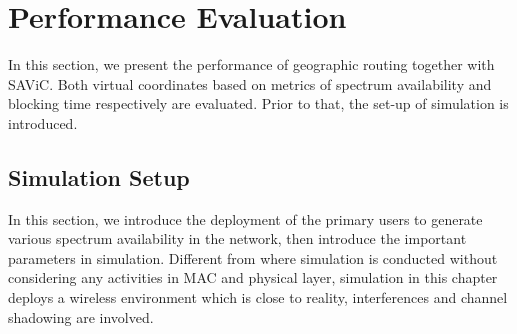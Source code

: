 \section{Performance Evaluation}
In this section, we present the performance of geographic routing together with SAViC.
Both virtual coordinates based on metrics of spectrum availability and blocking time respectively are evaluated.
Prior to that, the set-up of simulation is introduced.


\subsection{Simulation Setup}
In this section, we introduce the deployment of the primary users to generate various spectrum availability in the network, then introduce the important parameters in simulation.
Different from \cite{gpsfree05infocom} where simulation is conducted without considering any activities in MAC and physical layer, simulation in this chapter deploys a wireless environment which is close to reality, \eg interferences and channel shadowing are involved.


